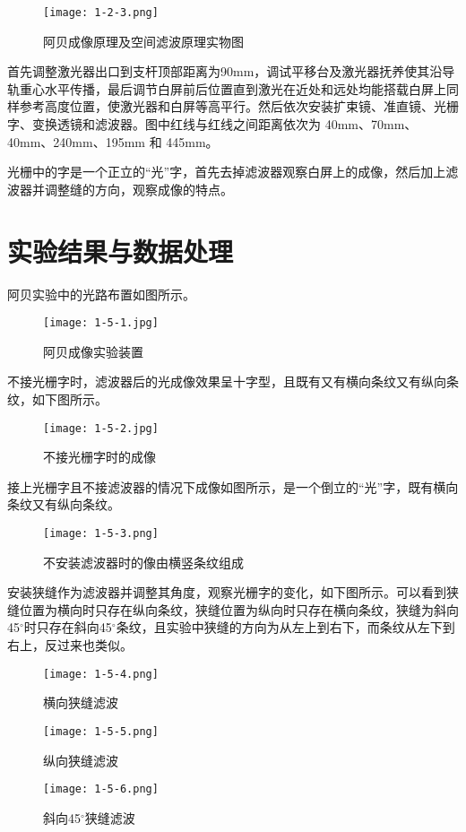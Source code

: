 \documentclass[12pt]{article}
\begin{document}
\begin{figure}[htbp]
    \centering
    \texttt{[image: 1-2-3.png]}
    \caption{阿贝成像原理及空间滤波原理实物图}
\end{figure}

首先调整激光器出口到支杆顶部距离为90mm，调试平移台及激光器抚养使其沿导轨重心水平传播，最后调节白屏前后位置直到激光在近处和远处均能搭载白屏上同样参考高度位置，使激光器和白屏等高平行。然后依次安装扩束镜、准直镜、光栅字、变换透镜和滤波器。图中红线与红线之间距离依次为 40mm、70mm、40mm、240mm、195mm 和 445mm。

光栅中的字是一个正立的“光”字，首先去掉滤波器观察白屏上的成像，然后加上滤波器并调整缝的方向，观察成像的特点。

\section{实验结果与数据处理}
阿贝实验中的光路布置如图所示。

\begin{figure}[htbp]
    \centering
    \texttt{[image: 1-5-1.jpg]}
    \caption{阿贝成像实验装置}
\end{figure}

不接光栅字时，滤波器后的光成像效果呈十字型，且既有又有横向条纹又有纵向条纹，如下图所示。

\begin{figure}[h!]
    \centering
    \texttt{[image: 1-5-2.jpg]}
    \caption{不接光栅字时的成像}
\end{figure}

接上光栅字且不接滤波器的情况下成像如图所示，是一个倒立的“光”字，既有横向条纹又有纵向条纹。

\begin{figure}[htbp]
    \centering
    \texttt{[image: 1-5-3.png]}
    \caption{不安装滤波器时的像由横竖条纹组成}
\end{figure}

安装狭缝作为滤波器并调整其角度，观察光栅字的变化，如下图所示。可以看到狭缝位置为横向时只存在纵向条纹，狭缝位置为纵向时只存在横向条纹，狭缝为斜向45$^\circ$时只存在斜向45$^\circ$条纹，且实验中狭缝的方向为从左上到右下，而条纹从左下到右上，反过来也类似。

\begin{figure}[htbp]
    \centering
    \begin{minipage}[c]{0.3\textwidth}
        \centering
        \texttt{[image: 1-5-4.png]}
        \caption{横向狭缝滤波}
    \end{minipage}
    \begin{minipage}[c]{0.3\textwidth}
        \centering
        \texttt{[image: 1-5-5.png]}
        \caption{纵向狭缝滤波}
    \end{minipage}
    \begin{minipage}[c]{0.3\textwidth}
        \centering
        \texttt{[image: 1-5-6.png]}
        \caption{斜向45$^\circ$狭缝滤波}
    \end{minipage}
\end{figure}
\end{document}
